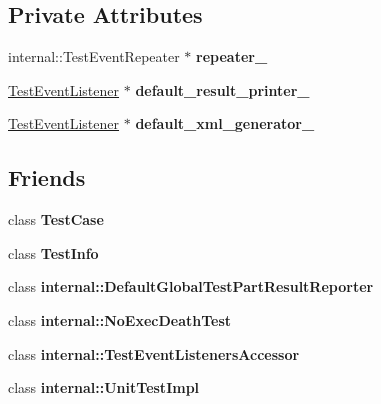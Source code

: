 \subsection*{Private Attributes}
\begin{DoxyCompactItemize}
\item 
\mbox{\label{classtesting_1_1_test_event_listeners_a625d58b951893e80cde12862aece6fd8}} 
internal\+::\+Test\+Event\+Repeater $\ast$ {\bfseries repeater\+\_\+}
\item 
\mbox{\label{classtesting_1_1_test_event_listeners_a9ff9ebc31a9a52e5f108661cfcb7ecd9}} 
\hyperlink{classtesting_1_1_test_event_listener}{Test\+Event\+Listener} $\ast$ {\bfseries default\+\_\+result\+\_\+printer\+\_\+}
\item 
\mbox{\label{classtesting_1_1_test_event_listeners_a018a3952aa10c19251b88f27abe373d3}} 
\hyperlink{classtesting_1_1_test_event_listener}{Test\+Event\+Listener} $\ast$ {\bfseries default\+\_\+xml\+\_\+generator\+\_\+}
\end{DoxyCompactItemize}
\subsection*{Friends}
\begin{DoxyCompactItemize}
\item 
\mbox{\label{classtesting_1_1_test_event_listeners_aff779e55b06adfa7c0088bd10253f0f0}} 
class {\bfseries Test\+Case}
\item 
\mbox{\label{classtesting_1_1_test_event_listeners_a4c49c2cdb6c328e6b709b4542f23de3c}} 
class {\bfseries Test\+Info}
\item 
\mbox{\label{classtesting_1_1_test_event_listeners_abae39633da9932847b41cb80efd62115}} 
class {\bfseries internal\+::\+Default\+Global\+Test\+Part\+Result\+Reporter}
\item 
\mbox{\label{classtesting_1_1_test_event_listeners_afddba49fdf3f493532b4d5efb9814f4e}} 
class {\bfseries internal\+::\+No\+Exec\+Death\+Test}
\item 
\mbox{\label{classtesting_1_1_test_event_listeners_addbc107b6b445617c880182bd4f44cf9}} 
class {\bfseries internal\+::\+Test\+Event\+Listeners\+Accessor}
\item 
\mbox{\label{classtesting_1_1_test_event_listeners_acc0a5e7573fd6ae7ad1878613bb86853}} 
class {\bfseries internal\+::\+Unit\+Test\+Impl}
\end{DoxyCompactItemize}


